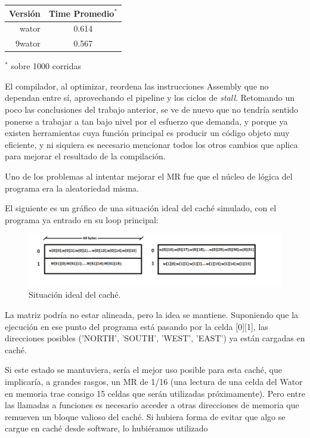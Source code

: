 \documentclass[a4paper,10pt]{article}
\begin{document}
\begin{center}
  \begin{tabular}{| r | c |}
    \hline
    Versi\'on	&   Time Promedio$^*$  \\ \hline \hline
    wator	&	0.614		\\ \hline
    9wator	&	0.567		\\ \hline
  \end{tabular}


    \small{$^*$ sobre 1000 corridas}
  \bigskip
\end{center}    %

    El compilador, al optimizar, reordena las instrucciones Assembly que no dependan entre s\'i, aprovechando el pipeline y los ciclos de \textit{stall}. Retomando un poco las conclusiones del trabajo anterior, se ve de nuevo que no tendr\'ia sentido ponerse a trabajar a tan bajo nivel por el esfuerzo que demanda, y porque ya existen herramientas cuya funci\'on principal es producir un c\'odigo objeto muy eficiente, y ni siquiera es necesario mencionar todos los otros cambios que aplica para mejorar el resultado de la compilaci\'on.

    Uno de los problemas al intentar mejorar el MR fue que el n\'ucleo de l\'ogica del programa era la aleatoriedad misma.

El siguiente es un gr\'afico de una situaci\'on ideal del cach\'e simulado, con el programa ya entrado en su loop principal:

\begin{figure}[!htp]
\begin{center}
\includegraphics[width=1\textwidth]{Cache.png}
\end{center}
\caption{Situaci\'on ideal del cach\'e.} \label{fig001234}
\end{figure}

La matriz podr\'ia no estar alineada, pero la idea se mantiene. Suponiendo que la ejecuci\'on en ese punto del programa est\'a pasando por la celda [0][1], las direcciones posibles ('NORTH', 'SOUTH', 'WEST', 'EAST') ya est\'an cargadas en cach\'e.

Si este estado se mantuviera, ser\'ia el mejor uso posible para esta cach\'e, que implicar\'ia, a grandes rasgos, un MR de 1/16 (una lectura de una celda del Wator en memoria trae consigo 15 celdas que ser\'an utilizadas pr\'oximamente). Pero entre las llamadas a funciones es necesario acceder a otras direcciones de memoria que remueven un bloque valioso del cach\'e. Si hubiera forma de evitar que algo se cargue en cach\'e desde software, lo hubi\'eramos utilizado
    
\end{document}
